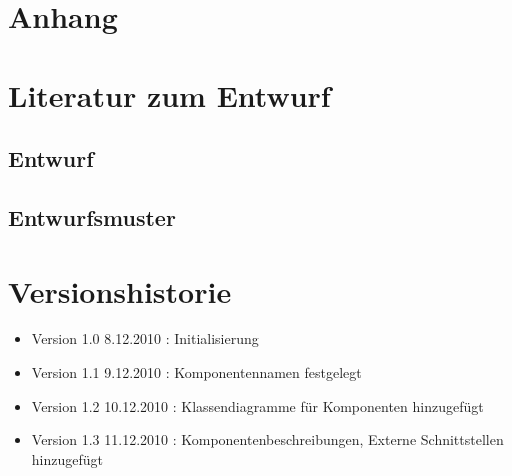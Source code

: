 \documentclass[a4paper,12pt]{scrartcl}
\begin{document}

\appendix%

\section{Anhang}

\section{Literatur zum Entwurf}
\subsection{Entwurf}
\subsection{Entwurfsmuster}
\section{Versionshistorie}
\begin{itemize}
\item Version 1.0 8.12.2010 : Initialisierung
\item Version 1.1 9.12.2010 : Komponentennamen festgelegt
\item Version 1.2 10.12.2010 : Klassendiagramme für Komponenten hinzugefügt
\item Version 1.3 11.12.2010 : Komponentenbeschreibungen, Externe Schnittstellen hinzugefügt
\end{itemize}
\end{document}
